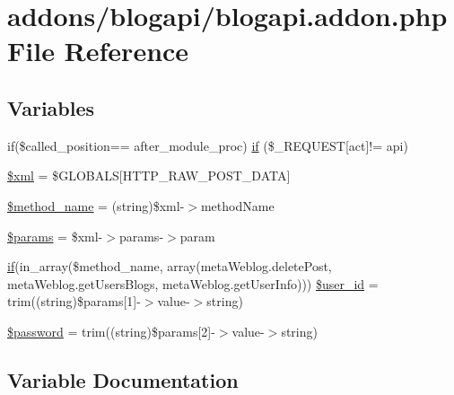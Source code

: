 \hypertarget{blogapi_8addon_8php}{}\section{addons/blogapi/blogapi.addon.\+php File Reference}
\label{blogapi_8addon_8php}
\subsection*{Variables}
\begin{DoxyCompactItemize}
\item 
if(\$called\+\_\+position== \textquotesingle{}after\+\_\+module\+\_\+proc\textquotesingle{}) \hyperlink{blogapi_8addon_8php_ae00067f6d78515f89a86a2a7f42cdc80}{if} (\$\+\_\+\+R\+E\+Q\+U\+E\+S\+T\mbox{[}\textquotesingle{}act\textquotesingle{}\mbox{]}!= \textquotesingle{}api\textquotesingle{})
\item 
\hyperlink{blogapi_8addon_8php_aa108d9d91e700ac530401dd363b0723b}{\$xml} = \$G\+L\+O\+B\+A\+L\+S\mbox{[}\textquotesingle{}H\+T\+T\+P\+\_\+\+R\+A\+W\+\_\+\+P\+O\+S\+T\+\_\+\+D\+A\+T\+A\textquotesingle{}\mbox{]}
\item 
\hyperlink{blogapi_8addon_8php_a88c34f4701e451bbcef63e44e5902ebd}{\$method\+\_\+name} = (string)\$xml-\/$>$method\+Name
\item 
\hyperlink{blogapi_8addon_8php_afe68e6fbe7acfbffc0af0c84a1996466}{\$params} = \$xml-\/$>$params-\/$>$param
\item 
\hyperlink{point__level__icon_8addon_8php_a29031816e50a8f742422e671b2bef9b2}{if}(in\+\_\+array(\$method\+\_\+name, array(\textquotesingle{}meta\+Weblog.\+delete\+Post\textquotesingle{}, \textquotesingle{}meta\+Weblog.\+get\+Users\+Blogs\textquotesingle{}, \textquotesingle{}meta\+Weblog.\+get\+User\+Info\textquotesingle{}))) \hyperlink{blogapi_8addon_8php_a6d0a036129b3030ce289a026c5e1eff2}{\$user\+\_\+id} = trim((string)\$params\mbox{[}1\mbox{]}-\/$>$value-\/$>$string)
\item 
\hyperlink{blogapi_8addon_8php_a607686ef9f99ea7c42f4f3dd3dbb2b0d}{\$password} = trim((string)\$params\mbox{[}2\mbox{]}-\/$>$value-\/$>$string)
\end{DoxyCompactItemize}


\subsection{Variable Documentation}
\hypertarget{blogapi_8addon_8php_a88c34f4701e451bbcef63e44e5902ebd}{}

